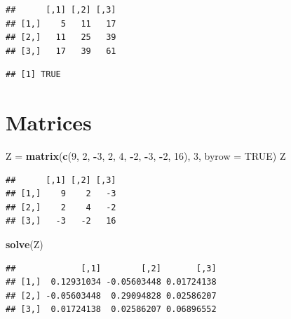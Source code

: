\documentclass[]{book}
\newenvironment{Shaded}{\begin{snugshade}}{\end{snugshade}}
\newcommand{\KeywordTok}[1]{\textcolor[rgb]{0.13,0.29,0.53}{\textbf{#1}}}
\newcommand{\DataTypeTok}[1]{\textcolor[rgb]{0.13,0.29,0.53}{#1}}
\newcommand{\DecValTok}[1]{\textcolor[rgb]{0.00,0.00,0.81}{#1}}
\newcommand{\StringTok}[1]{\textcolor[rgb]{0.31,0.60,0.02}{#1}}
\newcommand{\OtherTok}[1]{\textcolor[rgb]{0.56,0.35,0.01}{#1}}
\newcommand{\OperatorTok}[1]{\textcolor[rgb]{0.81,0.36,0.00}{\textbf{#1}}}
\newcommand{\NormalTok}[1]{#1}
\theoremstyle{definition}
\theoremstyle{definition}
\theoremstyle{definition}
\theoremstyle{remark}
\begin{document}
\begin{verbatim}
##      [,1] [,2] [,3]
## [1,]    5   11   17
## [2,]   11   25   39
## [3,]   17   39   61
\end{verbatim}

\begin{Shaded}
\end{Shaded}

\begin{verbatim}
## [1] TRUE
\end{verbatim}

\section{Matrices}\label{matrices-1}

\begin{Shaded}
\begin{Highlighting}[]
\NormalTok{Z =}\StringTok{ }\KeywordTok{matrix}\NormalTok{(}\KeywordTok{c}\NormalTok{(}\DecValTok{9}\NormalTok{, }\DecValTok{2}\NormalTok{, }\OperatorTok{-}\DecValTok{3}\NormalTok{, }\DecValTok{2}\NormalTok{, }\DecValTok{4}\NormalTok{, }\OperatorTok{-}\DecValTok{2}\NormalTok{, }\OperatorTok{-}\DecValTok{3}\NormalTok{, }\OperatorTok{-}\DecValTok{2}\NormalTok{, }\DecValTok{16}\NormalTok{), }\DecValTok{3}\NormalTok{, }\DataTypeTok{byrow =} \OtherTok{TRUE}\NormalTok{)}
\NormalTok{Z}
\end{Highlighting}
\end{Shaded}

\begin{verbatim}
##      [,1] [,2] [,3]
## [1,]    9    2   -3
## [2,]    2    4   -2
## [3,]   -3   -2   16
\end{verbatim}

\begin{Shaded}
\begin{Highlighting}[]
\KeywordTok{solve}\NormalTok{(Z)}
\end{Highlighting}
\end{Shaded}

\begin{verbatim}
##             [,1]        [,2]       [,3]
## [1,]  0.12931034 -0.05603448 0.01724138
## [2,] -0.05603448  0.29094828 0.02586207
## [3,]  0.01724138  0.02586207 0.06896552
\end{verbatim}
\end{document}
